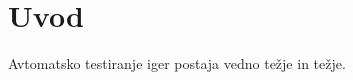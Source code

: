 
\mainmatter
\setcounter{page}{1}
\pagestyle{fancy}

\chapter{Uvod}
Avtomatsko testiranje iger postaja vedno težje in težje.